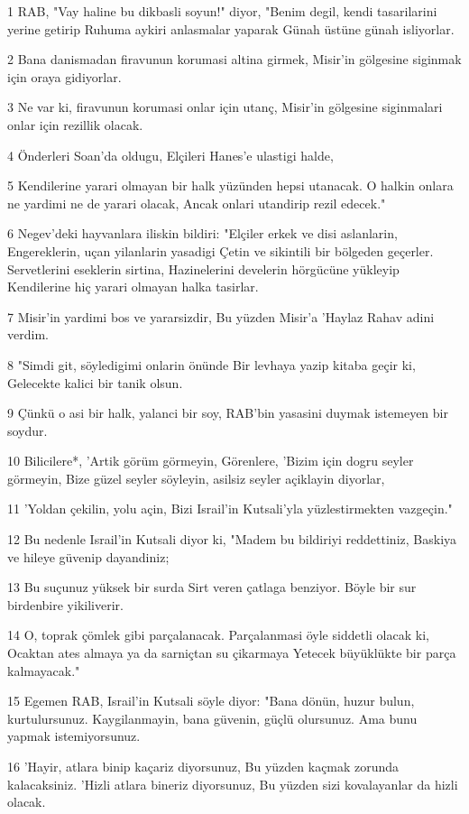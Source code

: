 \par 1 RAB, "Vay haline bu dikbasli soyun!" diyor, "Benim degil, kendi tasarilarini yerine getirip Ruhuma aykiri anlasmalar yaparak Günah üstüne günah isliyorlar.
\par 2 Bana danismadan firavunun korumasi altina girmek, Misir'in gölgesine siginmak için oraya gidiyorlar.
\par 3 Ne var ki, firavunun korumasi onlar için utanç, Misir'in gölgesine siginmalari onlar için rezillik olacak.
\par 4 Önderleri Soan'da oldugu, Elçileri Hanes'e ulastigi halde,
\par 5 Kendilerine yarari olmayan bir halk yüzünden hepsi utanacak. O halkin onlara ne yardimi ne de yarari olacak, Ancak onlari utandirip rezil edecek."
\par 6 Negev'deki hayvanlara iliskin bildiri: "Elçiler erkek ve disi aslanlarin, Engereklerin, uçan yilanlarin yasadigi Çetin ve sikintili bir bölgeden geçerler. Servetlerini eseklerin sirtina, Hazinelerini develerin hörgücüne yükleyip Kendilerine hiç yarari olmayan halka tasirlar.
\par 7 Misir'in yardimi bos ve yararsizdir, Bu yüzden Misir'a 'Haylaz Rahav adini verdim.
\par 8 "Simdi git, söyledigimi onlarin önünde Bir levhaya yazip kitaba geçir ki, Gelecekte kalici bir tanik olsun.
\par 9 Çünkü o asi bir halk, yalanci bir soy, RAB'bin yasasini duymak istemeyen bir soydur.
\par 10 Bilicilere*, 'Artik görüm görmeyin, Görenlere, 'Bizim için dogru seyler görmeyin, Bize güzel seyler söyleyin, asilsiz seyler açiklayin diyorlar,
\par 11 'Yoldan çekilin, yolu açin, Bizi Israil'in Kutsali'yla yüzlestirmekten vazgeçin."
\par 12 Bu nedenle Israil'in Kutsali diyor ki, "Madem bu bildiriyi reddettiniz, Baskiya ve hileye güvenip dayandiniz;
\par 13 Bu suçunuz yüksek bir surda Sirt veren çatlaga benziyor. Böyle bir sur birdenbire yikiliverir.
\par 14 O, toprak çömlek gibi parçalanacak. Parçalanmasi öyle siddetli olacak ki, Ocaktan ates almaya ya da sarniçtan su çikarmaya Yetecek büyüklükte bir parça kalmayacak."
\par 15 Egemen RAB, Israil'in Kutsali söyle diyor: "Bana dönün, huzur bulun, kurtulursunuz. Kaygilanmayin, bana güvenin, güçlü olursunuz. Ama bunu yapmak istemiyorsunuz.
\par 16 'Hayir, atlara binip kaçariz diyorsunuz, Bu yüzden kaçmak zorunda kalacaksiniz. 'Hizli atlara bineriz diyorsunuz, Bu yüzden sizi kovalayanlar da hizli olacak.
